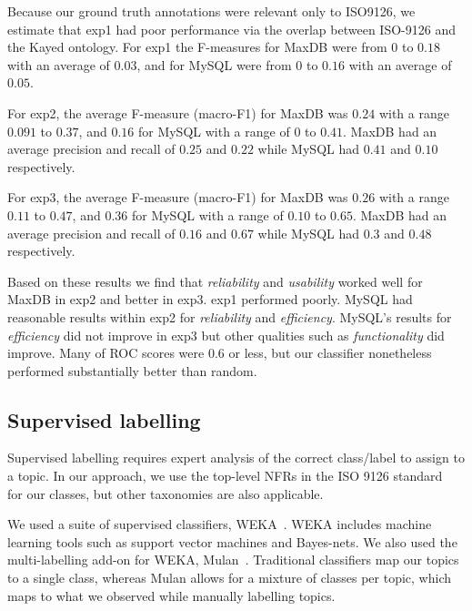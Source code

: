 \documentclass[]{sig-alternate}
\begin{document}

Because our ground truth annotations were relevant only to ISO9126,
we estimate that \textsf{exp1} had poor
performance via the overlap between ISO-9126 and the Kayed ontology.
For \textsf{exp1} the F-measures for MaxDB were from $0$ to $0.18$ with an average
of $0.03$, and for MySQL were from $0$ to $0.16$ with an average of
$0.05$.


For \textsf{exp2}, the average F-measure (macro-F1) for MaxDB was $0.24$ with a range $0.091$ to
$0.37$, and $0.16$ for MySQL with a range of $0$ to $0.41$.
MaxDB had an average precision and recall of $0.25$ and $0.22$
while MySQL had $0.41$ and $0.10$ respectively.

For \textsf{exp3}, the average F-measure (macro-F1) for MaxDB was $0.26$ with a range $0.11$ to
$0.47$, and $0.36$ for MySQL with a range of $0.10$ to $0.65$.
MaxDB had an average precision and recall of $0.16$ and $0.67$
while MySQL had $0.3$ and $0.48$ respectively.

Based on these results we find that \emph{reliability} and
\emph{usability} worked well for MaxDB in \textsf{exp2} and better in
\textsf{exp3}. 
\textsf{exp1} performed poorly.
MySQL had reasonable results within \textsf{exp2} for \emph{reliability} and \emph{efficiency}. 
MySQL's results for \emph{efficiency} did not improve in \textsf{exp3}
but other qualities such as \emph{functionality} did improve. 
Many of ROC scores were $0.6$ or less, but our classifier nonetheless performed substantially better than random.


\subsection{Supervised labelling}
\label{sec:suplabelling}
Supervised labelling requires expert analysis of the correct class/label to assign to a topic. In our approach, we use the top-level NFRs in the ISO 9126 standard~\cite{iso9126} for our classes, but other taxonomies are also applicable.%

We used a suite of supervised classifiers, WEKA~\cite{weka09}. 
WEKA includes machine learning tools such as support vector machines and Bayes-nets. 
We also used the multi-labelling add-on for WEKA, Mulan~\cite{mulan}. %
Traditional classifiers map our topics to a single class, whereas Mulan allows for a mixture of classes per topic, which maps to what we observed while manually labelling topics.
\end{document}
